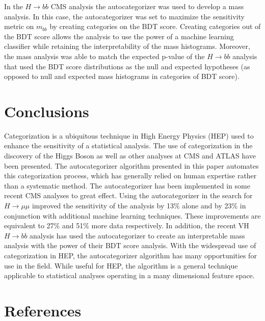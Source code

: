 \documentclass[review]{elsarticle}
\begin{document}
In the $H\rightarrow bb$ CMS analysis the autocategorizer was used to develop a mass analysis. In this case, the autocategorizer was set to maximize the sensitivity metric on $m_{bb}$ by creating categories on the BDT score. Creating categories out of the BDT score allows the analysis to use the power of a machine learning classifier while retaining the interpretability of the mass histograms. Moreover, the mass analysis was able to match the expected p-value of the $H\rightarrow bb$ analysis that used the BDT score distributions as the null and expected hypotheses (as opposed to null and expected mass histograms in categories of BDT score). 



\FloatBarrier
\section{Conclusions}
\label{conc}
Categorization is a ubiquitous technique in High Energy Physics (HEP) used to enhance the sensitivity of a statistical analysis. The use of categorization in the discovery of the Higgs Boson as well as other analyses at CMS and ATLAS have been presented. The autocategorizer algorithm presented in this paper automates this categorization process, which has generally relied on human expertise rather than a systematic method. The autocategorizer has been implemented in some recent CMS analyses to great effect. Using the autocategorizer in the search for $H\rightarrow\mu\mu$ improved the sensitivity of the analysis by 13\% alone and by 23\% in conjunction with additional machine learning techniques. These improvements are equivalent to 27\% and 51\% more data respectively. In addition, the recent VH $H\rightarrow bb$ analysis has used the autocategorizer to create an interpretable mass analysis with the power of their BDT score analysis. With the widespread use of categorization in HEP, the autocategorizer algorithm has many opportunities for use in the field. While useful for HEP, the algorithm is a general technique applicable to statistical analyses operating in a many dimensional feature space. 

\section*{References}


\end{document}
